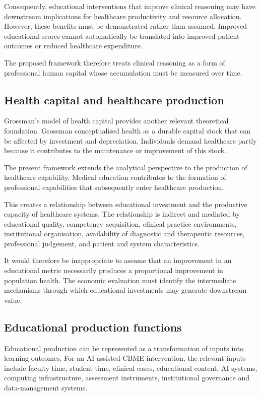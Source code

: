 \documentclass[11pt,a4paper]{article}
\begin{document}
Consequently, educational interventions that improve clinical reasoning may have downstream implications for healthcare productivity and resource allocation. However, these benefits must be demonstrated rather than assumed. Improved educational scores cannot automatically be translated into improved patient outcomes or reduced healthcare expenditure.

The proposed framework therefore treats clinical reasoning as a form of professional human capital whose accumulation must be measured over time.

\subsection{Health capital and healthcare production}
Grossman's model of health capital provides another relevant theoretical foundation. Grossman conceptualised health as a durable capital stock that can be affected by investment and depreciation. Individuals demand healthcare partly because it contributes to the maintenance or improvement of this stock.

The present framework extends the analytical perspective to the production of healthcare capability. Medical education contributes to the formation of professional capabilities that subsequently enter healthcare production.

This creates a relationship between educational investment and the productive capacity of healthcare systems. The relationship is indirect and mediated by educational quality, competency acquisition, clinical practice environments, institutional organisation, availability of diagnostic and therapeutic resources, professional judgement, and patient and system characteristics.

It would therefore be inappropriate to assume that an improvement in an educational metric necessarily produces a proportional improvement in population health. The economic evaluation must identify the intermediate mechanisms through which educational investments may generate downstream value.

\subsection{Educational production functions}
Educational production can be represented as a transformation of inputs into learning outcomes. For an AI-assisted CBME intervention, the relevant inputs include faculty time, student time, clinical cases, educational content, AI systems, computing infrastructure, assessment instruments, institutional governance and data-management systems.
\end{document}
